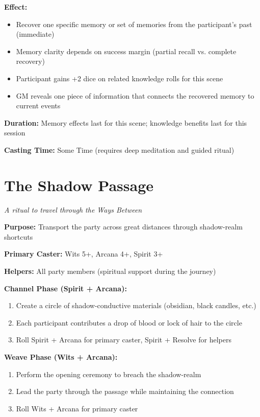 \textbf{Effect:}
\begin{itemize}
\item Recover one specific memory or set of memories from the participant's past (immediate)
\item Memory clarity depends on success margin (partial recall vs. complete recovery)
\item Participant gains +2 dice on related knowledge rolls for this scene
\item GM reveals one piece of information that connects the recovered memory to current events
\end{itemize}

\textbf{Duration:} Memory effects last for this scene; knowledge benefits last for this session

\textbf{Casting Time:} Some Time (requires deep meditation and guided ritual)

\section*{The Shadow Passage}
\textit{A ritual to travel through the Ways Between}

\textbf{Purpose:} Transport the party across great distances through shadow-realm shortcuts

\textbf{Primary Caster:} Wits 5+, Arcana 4+, Spirit 3+

\textbf{Helpers:} All party members (spiritual support during the journey)

\textbf{Channel Phase (Spirit + Arcana):}
\begin{enumerate}
\item Create a circle of shadow-conductive materials (obsidian, black candles, etc.)
\item Each participant contributes a drop of blood or lock of hair to the circle
\item Roll Spirit + Arcana for primary caster, Spirit + Resolve for helpers
\end{enumerate}

\textbf{Weave Phase (Wits + Arcana):}
\begin{enumerate}
\item Perform the opening ceremony to breach the shadow-realm
\item Lead the party through the passage while maintaining the connection
\item Roll Wits + Arcana for primary caster
\end{enumerate}

